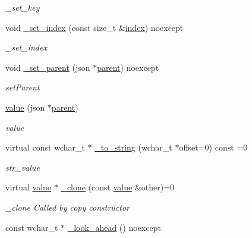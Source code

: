 \begin{DoxyCompactItemize}
\begin{DoxyCompactList}\small\item\em \+\_\+set\+\_\+key \end{DoxyCompactList}\item 
void \hyperlink{classformat_1_1value_a6b16897991f5e9166924d644b213dad6}{\+\_\+set\+\_\+index} (const size\+\_\+t \&\hyperlink{classformat_1_1value_aaa429b28cc0edf5a3589b89a1820ad62}{index}) noexcept
\begin{DoxyCompactList}\small\item\em \+\_\+set\+\_\+index \end{DoxyCompactList}\item 
void \hyperlink{classformat_1_1value_a1be7f20ce6fd552089771422dc28b695}{\+\_\+set\+\_\+parent} (json $\ast$\hyperlink{classformat_1_1value_a86c03ec8810bfd0d60ec49095120040d}{parent}) noexcept
\begin{DoxyCompactList}\small\item\em set\+Parent \end{DoxyCompactList}\item 
\hyperlink{classformat_1_1value_a2d4230f4fa939f6f5c451dbebc7fffba}{value} (json $\ast$\hyperlink{classformat_1_1value_a86c03ec8810bfd0d60ec49095120040d}{parent})
\begin{DoxyCompactList}\small\item\em value \end{DoxyCompactList}\item 
virtual const wchar\+\_\+t $\ast$ \hyperlink{classformat_1_1value_a94ed31f07b19866495297472accd33a8}{\+\_\+to\+\_\+string} (wchar\+\_\+t $\ast$offset=0) const =0
\begin{DoxyCompactList}\small\item\em str\+\_\+value \end{DoxyCompactList}\item 
virtual \hyperlink{classformat_1_1value}{value} $\ast$ \hyperlink{classformat_1_1value_a5d0a94cbdaf98d5420c5d55bd4345663}{\+\_\+clone} (const \hyperlink{classformat_1_1value}{value} \&other)=0
\begin{DoxyCompactList}\small\item\em \+\_\+clone Called by copy constructor \end{DoxyCompactList}\item 
const wchar\+\_\+t $\ast$ \hyperlink{classformat_1_1value_aea0aec2d465431ca45d20ff0a18f6ea6}{\+\_\+look\+\_\+ahead} () noexcept\hypertarget{classformat_1_1value_aea0aec2d465431ca45d20ff0a18f6ea6}{}\label{classformat_1_1value_aea0aec2d465431ca45d20ff0a18f6ea6}


\end{DoxyCompactItemize}
